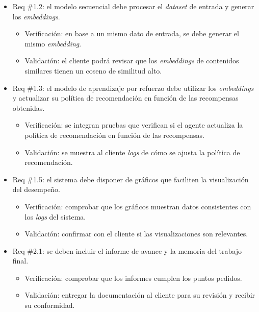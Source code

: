 \documentclass[
11pt, %
]{charter}
\begin{document}
\begin{itemize} 
\item Req \#1.2: el modelo secuencial debe procesar el \textit{dataset} de entrada y generar los \textit{embeddings}.

\begin{itemize}
	\item Verificación: en base a un mismo dato de entrada, se debe generar el mismo \textit{embedding}.
	\item Validación: el cliente podrá revisar que los \textit{embeddings} de contenidos similares tienen un coseno de similitud alto.
\end{itemize}

\end{itemize}

\begin{itemize} 
\item Req \#1.3: el modelo de aprendizaje por refuerzo debe utilizar los \textit{embeddings} y actualizar su política de recomendación en función de las recompensas obtenidas.

\begin{itemize}
	\item Verificación: se integran pruebas que verifican si el agente actualiza la política de recomendación en función de las recompensas.
	\item Validación: se muestra al cliente \textit{logs} de cómo se ajusta la política de recomendación.
\end{itemize}

\end{itemize}

\begin{itemize} 
\item Req \#1.5: el sistema debe disponer de gráficos que faciliten la visualización del desempeño.

\begin{itemize}
	\item Verificación: comprobar que los gráficos muestran datos consistentes con los \textit{logs} del sistema.
	\item Validación: confirmar con el cliente si las visualizaciones son relevantes.
\end{itemize}

\end{itemize}

\begin{itemize} 
\item Req \#2.1: se deben incluir el informe de avance y la memoria del trabajo final.

\begin{itemize}
	\item Verificación: comprobar que los informes cumplen los puntos pedidos.
	\item Validación: entregar la documentación al cliente para su revisión y recibir su conformidad.
\end{itemize}

\end{itemize}
\end{document}
